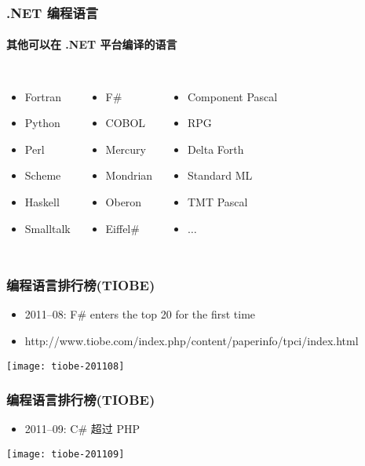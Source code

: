 \begin{frame}
\frametitle{.NET 编程语言}
\framesubtitle{其他可以在 .NET 平台编译的语言 }
\begin{columns}[t]
  \begin{itemize}
    \setlength{\itemsep}{8pt plus 1pt}
  \item Fortran
  \item Python
  \item Perl
  \item Scheme
  \item Haskell
  \item Smalltalk
  \end{itemize}
  \begin{itemize}
    \setlength{\itemsep}{8pt plus 1pt}
  \item F\#
  \item COBOL
  \item Mercury
  \item Mondrian
  \item Oberon
  \item Eiffel\#
  \end{itemize}
  \begin{itemize}
    \setlength{\itemsep}{8pt plus 1pt}
  \item Component Pascal
  \item RPG
  \item Delta Forth
  \item Standard ML
  \item TMT Pascal
  \item $\ldots$
  \end{itemize}
\end{columns}
\end{frame}


\begin{frame}
\frametitle{编程语言排行榜(TIOBE)}
\begin{itemize}
\item 2011--08: F\# enters the top 20 for the first time
\item {\scriptsize http://www.tiobe.com/index.php/content/paperinfo/tpci/index.html}
\end{itemize}

\centering\texttt{[image: tiobe-201108]}

\end{frame}

\begin{frame}
\frametitle{编程语言排行榜(TIOBE)}
\begin{itemize}
\item 2011--09: C\# 超过 PHP
\end{itemize}

\centering\texttt{[image: tiobe-201109]}

\end{frame}

